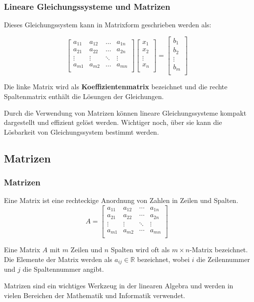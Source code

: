 \documentclass{beamer}
\begin{document}
\begin{frame}
  \frametitle{Lineare Gleichungssysteme und Matrizen}
  Dieses Gleichungssystem kann in Matrixform geschrieben werden als:
  
  \[
  \begin{bmatrix}
    a_{11} & a_{12} & \ldots & a_{1n} \\
    a_{21} & a_{22} & \ldots & a_{2n} \\
    \vdots & \vdots & \ddots & \vdots \\
    a_{m1} & a_{m2} & \ldots & a_{mn} \\
  \end{bmatrix}
  \begin{bmatrix}
    x_1 \\
    x_2 \\
    \vdots \\
    x_n \\
  \end{bmatrix}
  =
  \begin{bmatrix}
    b_1 \\
    b_2 \\
    \vdots \\
    b_m \\
  \end{bmatrix}
  \]
  
  Die linke Matrix wird als \textbf{Koeffizientenmatrix} bezeichnet und die rechte Spaltenmatrix enthält die Lösungen der Gleichungen.
  
  \vspace{0.3cm}
  
  Durch die Verwendung von Matrizen können lineare Gleichungssysteme kompakt dargestellt und effizient gelöst werden. Wichtiger noch, über sie kann die Lösbarkeit von Gleichungssystem bestimmt werden.
\end{frame}

\subsection{Matrizen}
\begin{frame}
  \frametitle{Matrizen}
  
  Eine Matrix ist eine rechteckige Anordnung von Zahlen in Zeilen und Spalten. 
  \[
A = \begin{bmatrix}
    a_{11} & a_{12} & \cdots & a_{1n} \\
    a_{21} & a_{22} & \cdots & a_{2n} \\
    \vdots & \vdots & \ddots & \vdots \\
    a_{m1} & a_{m2} & \cdots & a_{mn} \\
\end{bmatrix}
\]

  
  Eine Matrix $A$ mit $m$ Zeilen und $n$ Spalten wird oft als $m \times n$-Matrix bezeichnet. Die Elemente der Matrix werden als $a_{ij} \in \mathbb{R}$ bezeichnet, wobei $i$ die Zeilennummer und $j$ die Spaltennummer angibt.
  
  \vspace{0.3cm}
  Matrizen sind ein wichtiges
Werkzeug in der linearen Algebra und werden in vielen Bereichen
der Mathematik und Informatik verwendet.
  \end{frame}
\end{document}
